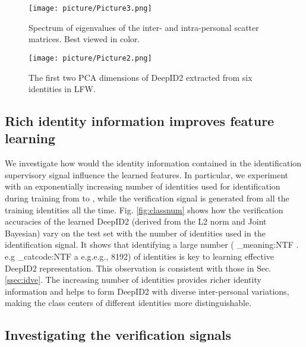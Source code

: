 \documentclass{article} \usepackage{nips14submit_e,times}
\makeatletter
\newcommand\latinabbrev[1]{
  \peek_meaning:NTF . {#1\@}{ \peek_catcode:NTF a {#1.\@ }{#1.\@}}}
\def\eg{\latinabbrev{e.g}}
\makeatother
\begin{document}
\begin{figure}[t]
\begin{center}
\texttt{[image: picture/Picture3.png]}
\end{center}
\vspace{-0.2in}
\caption{Spectrum of eigenvalues of the inter- and intra-personal scatter matrices. Best viewed in color.}
\label{fig:pca}
\vspace{-0.05in}
\end{figure}

\begin{figure}[t]
\begin{center}
\texttt{[image: picture/Picture2.png]}
\end{center}
\vspace{-0.2in}
\caption{The first two PCA dimensions of DeepID2 extracted from six identities in LFW.}
\label{fig:cluster}
\vspace{-0.1in}
\end{figure}


\subsection{Rich identity information improves feature learning}
\label{ssec:ident}

We investigate how would the identity information contained in the identification supervisory signal influence the learned features. In particular, we experiment with an exponentially increasing number of identities used for identification during training from  to , while the verification signal is generated from all the  training identities all the time. Fig. \ref{fig:classnum} shows how the verification accuracies of the learned DeepID2 (derived from the L2 norm and Joint Bayesian) vary on the test set with the number of identities used in the identification signal. It shows that identifying a large number (\eg, 8192) of identities is key to learning effective DeepID2 representation. This observation is consistent with those in Sec. \ref{ssec:idve}. The increasing number of identities provides richer identity information and helps to form DeepID2 with diverse inter-personal variations, making the class centers of different identities more distinguishable.


\subsection{Investigating the verification signals}
\label{ssec:verif}
\end{document}
